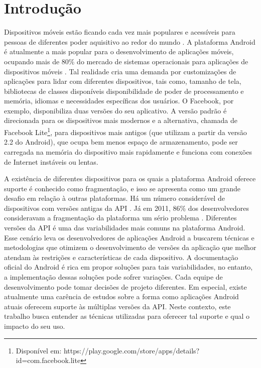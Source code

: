 \chapter{Introdução} \label{ch:introducao}

Dispositivos móveis estão ficando cada vez mais populares e acessíveis para
pessoas de diferentes poder aquisitivo ao redor do mundo \cite{Lhamas2014}.
A plataforma Android é atualmente a mais popular para o desenvolvimento de
aplicações móveis, ocupando mais de 80\% do mercado de sistemas operacionais
para aplicações de dispositivos móveis \cite{jim2014}. Tal realidade cria uma
demanda por customizações de aplicações para lidar com diferentes dispositivos,
tais como, tamanho de tela, bibliotecas de classes disponíveis 
disponibilidade de poder de processamento e memória, idiomas e
necessidades específicas dos usuários. O Facebook, por exemplo, disponibiliza
duas versões do seu aplicativo. A versão padrão é direcionada para os dispositivos
mais modernos e a alternativa, chamada de Facebook Lite\footnote{Disponível em:
https://play.google.com/store/apps/details?id=com.facebook.lite},
para dispositivos mais antigos (que utilizam a partir da versão 2.2 do Android),
que ocupa bem menos espaço de armazenamento, pode ser carregada na memória do
dispositivo mais rapidamente e funciona com conexões de Internet instáveis ou lentas.

A existência de diferentes dispositivos para os quais a plataforma Android oferece
suporte é conhecido como fragmentação, e isso se apresenta como um grande desafio
em relação à outras plataformas. Há um número considerável de dispositivos com versões
antigas da API \cite{Gronli2014}. Já em 2011, 86\% dos desenvolvedores consideravam
a fragmentação da plataforma um sério problema \cite{Elmer-DeWitt2011}.
Diferentes versões da API é uma das variabilidades mais comuns na plataforma Android.
Esse cenário leva os desenvolvedores de aplicações Android a buscarem técnicas e
metodologias que otimizem o desenvolvimento de versões da aplicação que melhor
atendam às restrições e características de cada dispositivo. A documentação oficial
do Android \cite{GuiaAndroid} é rica em propor soluções para tais variabilidades,
no entanto, a implementação dessas soluções pode sofrer variações. Cada equipe
de desenvolvimento pode tomar decisões de projeto diferentes. Em especial, existe
atualmente uma carência de estudos sobre a forma como aplicações Android atuais
oferecem suporte às múltiplas versões da API. Neste contexto, este trabalho busca
entender as técnicas utilizadas para oferecer tal suporte e qual o impacto do seu uso.

